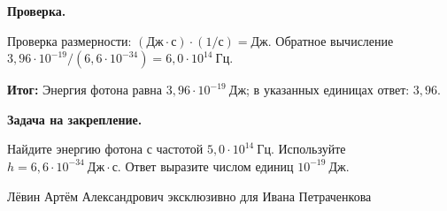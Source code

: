 \documentclass[11pt,a4paper]{article}
\newcommand{\reviewblock}[2]{\par\medskip\noindent\textbf{#1}\par\noindent#2\par}
\newcommand{\resultblock}[1]{\par\medskip\noindent\textcolor{teal!60!black}{\textbf{Итог:}} #1\par}
\begin{document}
\reviewblock{Проверка.}{Проверка размерности: $(\text{Дж}\cdot\text{с})\cdot(1/\text{с})=\text{Дж}$. Обратное вычисление $3{,}96\cdot10^{-19}/(6{,}6\cdot10^{-34})=6{,}0\cdot10^{14}\ \text{Гц}$.}

\resultblock{Энергия фотона равна $3{,}96\cdot10^{-19}\ \text{Дж}$; в указанных единицах ответ: $3{,}96$.}

\reviewblock{Задача на закрепление.}{Найдите энергию фотона с частотой $5{,}0\cdot10^{14}\ \text{Гц}$. Используйте $h=6{,}6\cdot10^{-34}\ \text{Дж}\cdot\text{с}$. Ответ выразите числом единиц $10^{-19}\ \text{Дж}$.}
\par\vfill
\begin{center}
\small Лёвин Артём Александрович эксклюзивно для Ивана Петраченкова
\end{center}
\end{document}
